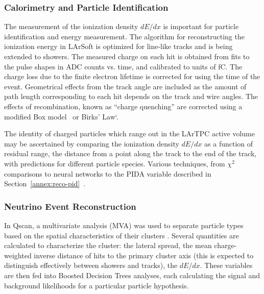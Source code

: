 
\subsubsection{Calorimetry and Particle Identification}

The measurement of the ionization density $dE/dx$ is important
for particle identification and energy measurement.
The algorithm for reconstructing the ionization
energy in LArSoft is optimized for line-like tracks and is being
extended to showers.  The measured charge on each hit is obtained from
fits to the pulse shapes in ADC counts vs. time, and calibrated to units
of fC.  The charge loss due to the finite electron lifetime is corrected for
using the time of the event.  Geometrical effects from the track angle are
included as the amount of path length corresponding to each hit depends on the
track and wire angles.  The effects of recombination, known as ``charge quenching''
are corrected using a modified Box model~\cite{Thomas:1987zz} or Birks' Law`\cite{Birks:1964zz}.

The identity of charged particles which range out in the LArTPC active
volume may be ascertained by comparing the ionization density $dE/dx$ as a function
of residual range, the distance from a point along the track to the end of the
track, with predictions for different particle species.  Various techniques,
from $\chi^2$ comparisons to neural networks to the PIDA variable described
in Section~\ref{annex:reco-pid}~\cite{Acciarri:2013met}.
 

\subsubsection{Neutrino Event Reconstruction}

In Qscan, a multivariate analysis (MVA) was used to separate particle types based on the spatial characteristics of their clusters
\cite{WA105_TDR,LAGUNA-LBNO-deliv,LAGUNA-LBNO-EOI}.
Several quantities are calculated to 
characterize the cluster: the lateral spread, the mean charge-weighted inverse distance of hits to the primary cluster axis
(this is expected to distinguish effectively between showers and tracks), the $dE/dx$.
These variables are then fed into Boosted Decision Trees analyses, 
each calculating the signal and background likelihoods for a particular particle hypothesis.

